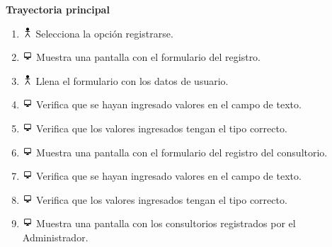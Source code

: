 \textbf{Trayectoria principal}
\begin{enumerate}
\item \includegraphics[height=1em]{pictures/actor.png} Selecciona la opción registrarse.
\item \includegraphics[height=1em]{pictures/sistema.png} Muestra una pantalla con el formulario del registro.
\item \includegraphics[height=1em]{pictures/actor.png} Llena el formulario con los datos de usuario.
\item \includegraphics[height=1em]{pictures/sistema.png} Verifica que se hayan ingresado valores en el campo de texto.
\item \includegraphics[height=1em]{pictures/sistema.png} Verifica que los valores ingresados tengan el tipo correcto.
\item \includegraphics[height=1em]{pictures/sistema.png} Muestra una pantalla con el formulario del registro del consultorio.
\item \includegraphics[height=1em]{pictures/sistema.png} Verifica que se hayan ingresado valores en el campo de texto.
\item \includegraphics[height=1em]{pictures/sistema.png} Verifica que los valores ingresados tengan el tipo correcto.
\item \includegraphics[height=1em]{pictures/sistema.png} Muestra una pantalla con los consultorios registrados por el Administrador.
\end{enumerate} \bigskip


